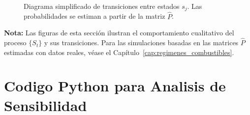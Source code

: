 \begin{appendices}
\begin{figure}[htbp]
\caption{Diagrama simplificado de transiciones entre estados \( s_j \). Las probabilidades se estiman a partir de la matriz \( \hat{P} \).}
\label{fig:apx_diagrama_transiciones}
\end{figure}

\vspace{1em}
\noindent\textbf{Nota:} Las figuras de esta sección ilustran el comportamiento cualitativo del proceso $\{S_t\}$ y sus transiciones. Para las simulaciones basadas en las matrices $\hat{P}$ estimadas con datos reales, véase el Capítulo~\ref{cap:regimenes_combustibles}.





\renewcommand{\thesection}{B\arabic{section}}
\renewcommand{\thesubsection}{B\arabic{section}.\arabic{subsection}}
\renewcommand{\thefigure}{B\arabic{figure}}
\renewcommand{\thetable}{B\arabic{table}}
\setcounter{section}{0} %
\setcounter{figure}{0}
\setcounter{table}{0}

\section{Codigo Python para Analisis de Sensibilidad}
\label{apx:codigo_sensibilidad}


\end{appendices}

